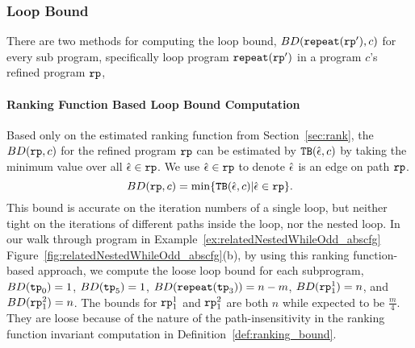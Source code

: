 
\subsubsection{Loop Bound}
There are two methods for computing the loop bound, $BD(\mathtt{repeat}(\mathtt{rp}'), c)$ for every sub program, specifically loop program $\mathtt{repeat}(\mathtt{rp}')$ in a program $c$'s refined program $\mathtt{rp}$,
%
\paragraph{Ranking Function Based Loop Bound Computation}
\label{sec:loopbound-rankbased}
Based only on the estimated ranking function from Section~\ref{sec:rank}, the $BD(\mathtt{rp}, c)$ for the refined program $\mathtt{rp}$ can be estimated by ${\mathtt{TB}}(\hat{\mathtt{\epsilon}{}}, c)$ by taking the
minimum value over all $\hat{\mathtt{\epsilon}{}} \in \mathtt{rp}$.
We use $\hat{\mathtt{\epsilon}{}} \in \mathtt{rp}$ to denote $\hat{\mathtt{\epsilon}{}}$ is an edge on path $\mathtt{rp}$.
\begin{equation}
  \label{eq:absBD}
  BD(\rprog, c) = \min\left\{ \absclr(\absevent, c) \middle\vert \absevent \in \rprog \right\}.
\end{equation}
%
This bound is accurate on the iteration numbers of a single loop, but neither tight on the iterations of different paths inside the loop, nor the nested loop.
%
In our walk through program in Example~\ref{ex:relatedNestedWhileOdd_abscfg} Figure~\ref{fig:relatedNestedWhileOdd_abscfg}(b), by using this ranking function-based approach, we compute the loose loop bound for each subprogram,
$BD(\mathtt{tp}_0) = 1$, $BD(\mathtt{tp}_5) = 1$, $BD(\mathtt{repeat}(\mathtt{tp}_3)) = n - m$, $BD(\mathtt{rp}_1^1) = n$, and $BD(\mathtt{rp}_1^2) = n $.
The bounds for $\mathtt{rp}_1^1$ and $\mathtt{rp}_1^2$ are both $n$ while expected to be $\frac{m}{4}$.
They are loose because of the nature of the path-insensitivity in the ranking function invariant computation in Definition~\ref{def:ranking_bound}. 

